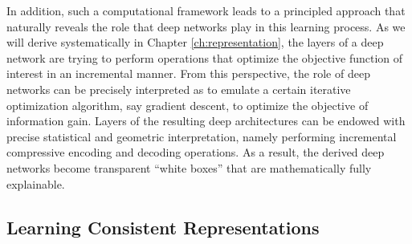 \documentclass[\toplevelprefix/book-main.tex]{subfiles}
\begin{document}
In addition, such a computational framework leads to a principled approach that naturally reveals the role that deep networks play in this learning process. As we will derive systematically in Chapter \ref{ch:representation}, the layers of a deep network are trying to perform operations that optimize the objective function of interest in an incremental manner. From this perspective, the role of deep networks can be precisely interpreted as to emulate a certain iterative optimization algorithm, say gradient descent, to optimize the objective of information gain. Layers of the resulting deep architectures can be endowed with precise statistical and geometric interpretation, namely performing incremental compressive encoding and decoding operations. As a result, the derived deep networks become transparent ``white boxes'' that are mathematically fully explainable.  











\subsection{Learning Consistent Representations}
\end{document}

